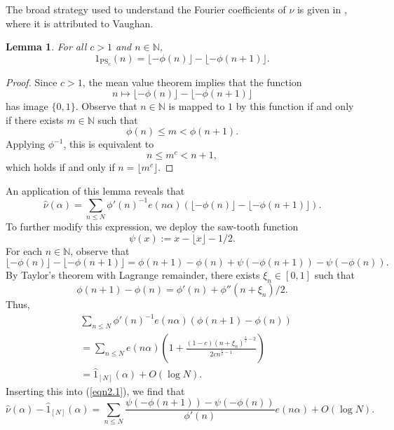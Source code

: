 \documentclass[12pt, reqno]{amsart}
\newtheorem{lemma}[thm]{Lemma}
\theoremstyle{definition}
\theoremstyle{remark}
\numberwithin{equation}{section}
\theoremstyle{definition}
\def\alp{{\alpha}} \def\bfalp{{\boldsymbol \alpha}}
\def\le{\leqslant} \def\ge{\geqslant} \def\pleq{\preccurlyeq} \def\ple{\prec}
\def \PS {\mathrm{PS}}
\def \N {\mathbb{N}}
\begin{document}
The broad strategy used to understand the Fourier coefficients of $\nu$ is given in \cite{HB1983}, where it is attributed to Vaughan.

\begin{lemma}
For all $c>1$ and $n\in\N$,
\[
1_{\PS_c}(n) = \lfloor -\phi(n) \rfloor - \lfloor - \phi(n+1) \rfloor.
\]
\end{lemma}

\begin{proof}
Since $c>1$, the mean value theorem implies that the function
\begin{equation*}
    n \mapsto \lfloor -\phi(n) \rfloor - \lfloor - \phi(n+1) \rfloor
\end{equation*}
has image $\{ 0,1 \}$. Observe that $n\in\N$ is mapped to $1$ by this function if and only if there exists $m\in\N$ such that
\begin{equation*}
    \phi(n)\leqslant m < \phi(n+1).
\end{equation*}
Applying $\phi^{-1}$, this is equivalent to
\begin{equation*}
    n \leqslant m^c < n+1,
\end{equation*}
which holds if and only if $n=\lfloor m^c\rfloor$.
\end{proof}

An application of this lemma reveals that
\begin{equation}
\label{eqn2.1}
\hat{\nu}(\alpha) = \sum_{n \le N}
\phi'(n)^{-1} e(n \alp)
(\lfloor -\phi(n) \rfloor - \lfloor - \phi(n+1) \rfloor).
\end{equation}
To further modify this expression, we deploy the saw-tooth function
\begin{equation*}
    \psi(x) := x-\lfloor x\rfloor - 1/2.
\end{equation*}
For each $n\in\N$, observe that
\[
\lfloor -\phi(n) \rfloor - \lfloor - \phi(n+1) \rfloor =
\phi(n+1) - \phi(n) + \psi(-\phi(n+1)) - \psi(-\phi(n)).
\]
By Taylor's theorem with Lagrange remainder, there exists $\xi_n\in[0,1]$ such that
\[
\phi(n+1) - \phi(n) = 
\phi'(n) + \phi''(n+\xi_n)/2.
\]
Thus,
\begin{align*}
&\sum_{n \le N}
\phi'(n)^{-1} e(n \alp)
(\phi(n+1) - \phi(n)) \\ &= 
\sum_{n \le N}
e(n \alp)\left( 1 + \frac{(1-c)(n+\xi_n)^{\frac{1}{c} - 2}}{2cn^{\frac{1}{c}-1}}\right)\\
& = \hat{1}_{[N]}(\alpha) + O(\log N).
\end{align*}
Inserting this into (\ref{eqn2.1}), we find that
\begin{equation*}
    \hat{\nu}(\alpha) - \hat{1}_{[N]}(\alpha) = \sum_{n \le N} 
\frac{\psi(-\phi(n+1)) - \psi(-\phi(n))}{\phi'(n)}
e(n\alp) + O(\log N).
\end{equation*}
\end{document}
